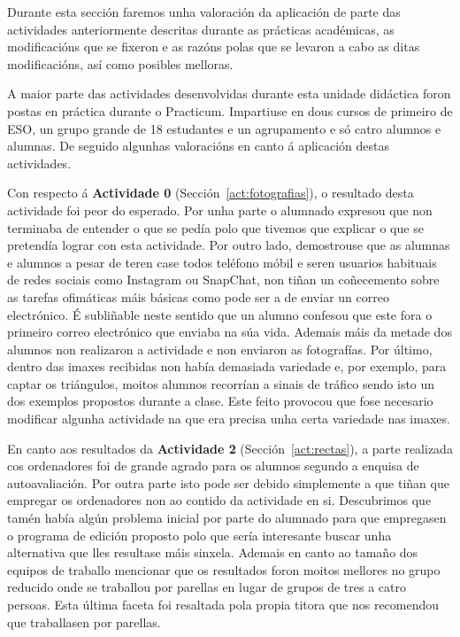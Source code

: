 Durante esta sección faremos unha valoración da aplicación de parte das actividades anteriormente descritas durante as prácticas académicas, as modificacións que se fixeron e as razóns polas que se levaron a cabo as ditas modificacións, así como posibles melloras.

A maior parte das actividades desenvolvidas durante esta unidade didáctica foron postas en práctica durante o Practicum. Impartiuse en dous cursos de primeiro de ESO, un grupo grande de 18 estudantes e un agrupamento e só catro alumnos e alumnas. De seguido algunhas valoracións en canto á aplicación destas actividades.

Con respecto á \textbf{Actividade 0} (Sección~\ref{act:fotografias}), o resultado desta actividade foi peor do esperado. Por unha parte o alumnado expresou que non terminaba de entender o que se pedía polo que tivemos que explicar o que se pretendía lograr con esta actividade. Por outro lado, demostrouse que as alumnas e alumnos a pesar de teren case todos teléfono móbil e seren usuarios habituais de redes sociais como Instagram ou SnapChat, non tiñan un coñecemento sobre as tarefas ofimáticas máis básicas como pode ser a de enviar un correo electrónico. É subliñable neste sentido que un alumno confesou que este fora o primeiro correo electrónico que enviaba na súa vida. Ademais máis da metade dos alumnos non realizaron a actividade e non enviaron as fotografías. Por último, dentro das imaxes recibidas non había demasiada variedade e, por exemplo, para captar os triángulos, moitos alumnos recorrían a sinais de tráfico sendo isto un dos exemplos propostos durante a clase. Este feito provocou que fose necesario modificar algunha actividade na que era precisa unha certa variedade nas imaxes.

En canto aos resultados da \textbf{Actividade 2} (Sección~\ref{act:rectas}), a parte realizada cos ordenadores foi de grande agrado para os alumnos segundo a enquisa de autoavaliación. Por outra parte isto pode ser debido simplemente a que tiñan que empregar os ordenadores non ao contido da actividade en si. Descubrimos que tamén había algún problema inicial por parte do alumnado para que empregasen o programa de edición proposto polo que sería interesante buscar unha alternativa que lles resultase máis sinxela. Ademais en canto ao tamaño dos equipos de traballo mencionar que os resultados foron moitos mellores no grupo reducido onde se traballou por parellas en lugar de grupos de tres a catro persoas. Esta última faceta foi resaltada pola propia titora que nos recomendou que traballasen por parellas.

